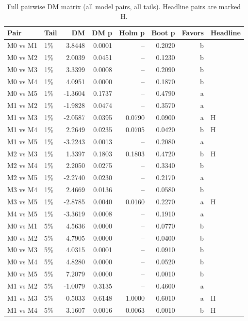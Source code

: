 \documentclass[11pt]{article}
\begin{document}
\begin{table}[ht]
\centering
\caption{Full pairwise DM matrix (all model pairs, all tails). Headline pairs are marked H.}\label{tab:dmappendix}
\footnotesize\begin{tabular}{llrrrrrl}
\hline
\textbf{Pair} & \textbf{Tail} & \textbf{DM} & \textbf{DM p} & \textbf{Holm p} & \textbf{Boot p} & \textbf{Favors} & \textbf{Headline}\\
\hline
M0 vs M1 & 1\% & 3.8448 & 0.0001 & -- & 0.2020 & b & \\
M0 vs M2 & 1\% & 2.0039 & 0.0451 & -- & 0.1230 & b & \\
M0 vs M3 & 1\% & 3.3399 & 0.0008 & -- & 0.2090 & b & \\
M0 vs M4 & 1\% & 4.0951 & 0.0000 & -- & 0.1870 & b & \\
M0 vs M5 & 1\% & -1.3604 & 0.1737 & -- & 0.4790 & a & \\
M1 vs M2 & 1\% & -1.9828 & 0.0474 & -- & 0.3570 & a & \\
M1 vs M3 & 1\% & -2.0587 & 0.0395 & 0.0790 & 0.0900 & a & H\\
M1 vs M4 & 1\% & 2.2649 & 0.0235 & 0.0705 & 0.0420 & b & H\\
M1 vs M5 & 1\% & -3.2243 & 0.0013 & -- & 0.2080 & a & \\
M2 vs M3 & 1\% & 1.3397 & 0.1803 & 0.1803 & 0.4720 & b & H\\
M2 vs M4 & 1\% & 2.2050 & 0.0275 & -- & 0.3340 & b & \\
M2 vs M5 & 1\% & -2.2740 & 0.0230 & -- & 0.2170 & a & \\
M3 vs M4 & 1\% & 2.4669 & 0.0136 & -- & 0.0580 & b & \\
M3 vs M5 & 1\% & -2.8785 & 0.0040 & 0.0160 & 0.2270 & a & H\\
M4 vs M5 & 1\% & -3.3619 & 0.0008 & -- & 0.1910 & a & \\
M0 vs M1 & 5\% & 4.5636 & 0.0000 & -- & 0.0770 & b & \\
M0 vs M2 & 5\% & 4.7905 & 0.0000 & -- & 0.0400 & b & \\
M0 vs M3 & 5\% & 4.0315 & 0.0001 & -- & 0.0910 & b & \\
M0 vs M4 & 5\% & 4.8280 & 0.0000 & -- & 0.0520 & b & \\
M0 vs M5 & 5\% & 7.2079 & 0.0000 & -- & 0.0010 & b & \\
M1 vs M2 & 5\% & -1.0079 & 0.3135 & -- & 0.4600 & a & \\
M1 vs M3 & 5\% & -0.5033 & 0.6148 & 1.0000 & 0.6010 & a & H\\
M1 vs M4 & 5\% & 3.1607 & 0.0016 & 0.0063 & 0.0010 & b & H\\

\end{tabular}
\end{table}
\end{document}

